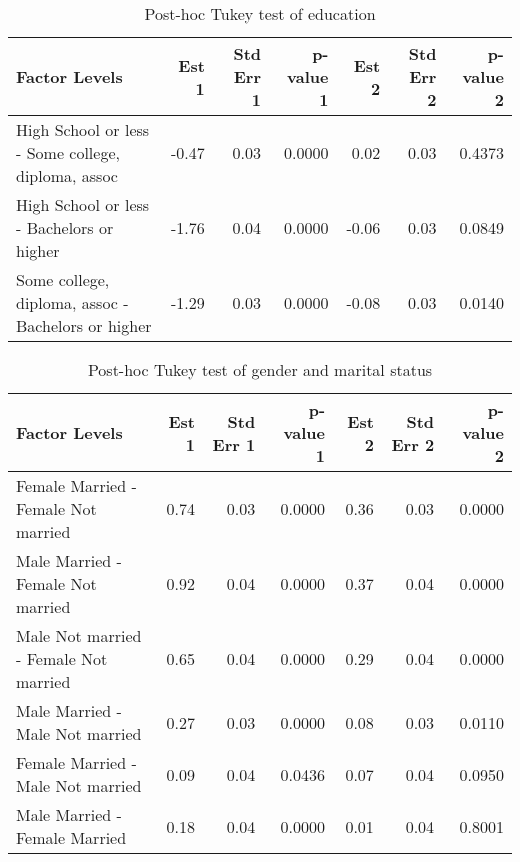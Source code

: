 \documentclass[11pt]{extarticle} %
\begin{document}
\begin{table}[H]
\footnotesize
\centering
\begin{tabular}{lrrrrrr}
  \hline
Factor Levels & Est 1 & Std Err 1 & p-value 1 & Est 2 & Std Err 2 & p-value 2 \\ 
  \hline
 High School or less - Some college, diploma, assoc & -0.47 & 0.03 & 0.0000 & 0.02 & 0.03 & 0.4373 \\ 
   High School or less - Bachelors or higher & -1.76 & 0.04 & 0.0000 & -0.06 & 0.03 & 0.0849 \\ 
   Some college, diploma, assoc - Bachelors or higher & -1.29 & 0.03 & 0.0000 & -0.08 & 0.03 & 0.0140 \\ 
   \hline
\end{tabular}
\caption{Post-hoc Tukey test of education} 
\label{tab:Education}
\end{table}

\begin{table}[H]
\footnotesize
\centering
\begin{tabular}{lrrrrrr}
  \hline
Factor Levels & Est 1 & Std Err 1 & p-value 1 & Est 2 & Std Err 2 & p-value 2 \\ 
  \hline
  Female Married -  Female Not married & 0.74 & 0.03 & 0.0000 & 0.36 & 0.03 & 0.0000 \\ 
    Male Married -  Female Not married & 0.92 & 0.04 & 0.0000 & 0.37 & 0.04 & 0.0000 \\ 
    Male Not married -  Female Not married & 0.65 & 0.04 & 0.0000 & 0.29 & 0.04 & 0.0000 \\ 
    Male Married -  Male Not married & 0.27 & 0.03 & 0.0000 & 0.08 & 0.03 & 0.0110 \\ 
    Female Married -  Male Not married & 0.09 & 0.04 & 0.0436 & 0.07 & 0.04 & 0.0950 \\ 
    Male Married -  Female Married & 0.18 & 0.04 & 0.0000 & 0.01 & 0.04 & 0.8001 \\ 
   \hline
\end{tabular}
\caption{Post-hoc Tukey test of gender and marital status} 
\label{tab:GenderMS}
\end{table}
\end{document}
